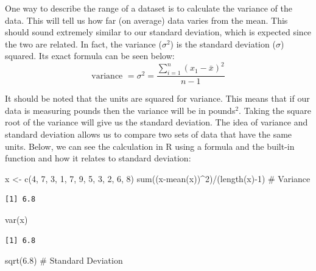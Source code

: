 \documentclass[
  letterpaper,
  DIV=11,
  numbers=noendperiod]{scrreprt}
\newenvironment{Shaded}{\begin{snugshade}}{\end{snugshade}}
\newcommand{\CommentTok}[1]{\textcolor[rgb]{0.37,0.37,0.37}{#1}}
\newcommand{\DecValTok}[1]{\textcolor[rgb]{0.68,0.00,0.00}{#1}}
\newcommand{\FloatTok}[1]{\textcolor[rgb]{0.68,0.00,0.00}{#1}}
\newcommand{\FunctionTok}[1]{\textcolor[rgb]{0.28,0.35,0.67}{#1}}
\newcommand{\NormalTok}[1]{\textcolor[rgb]{0.00,0.23,0.31}{#1}}
\newcommand{\OtherTok}[1]{\textcolor[rgb]{0.00,0.23,0.31}{#1}}
\newcommand{\SpecialCharTok}[1]{\textcolor[rgb]{0.37,0.37,0.37}{#1}}
\begin{document}
One way to describe the range of a dataset is to calculate the variance
of the data. This will tell us how far (on average) data varies from the
mean. This should sound extremely similar to our standard deviation,
which is expected since the two are related. In fact, the variance
(\(\sigma^2\)) is the standard deviation (\(\sigma\)) squared. Its exact
formula can be seen below:
\[ \text{variance } = \sigma^2 = \frac{\sum_{i=1}^n (x_1-\bar{x})^2}{n-1}\]

It should be noted that the units are squared for variance. This means
that if our data is measuring pounds then the variance will be in
pounds\(^2\). Taking the square root of the variance will give us the
standard deviation. The idea of variance and standard deviation allows
us to compare two sets of data that have the same units. Below, we can
see the calculation in R using a formula and the built-in function and
how it relates to standard deviation:

\begin{Shaded}
\begin{Highlighting}[]
\NormalTok{x }\OtherTok{\textless{}{-}} \FunctionTok{c}\NormalTok{(}\DecValTok{4}\NormalTok{, }\DecValTok{7}\NormalTok{, }\DecValTok{3}\NormalTok{, }\DecValTok{1}\NormalTok{, }\DecValTok{7}\NormalTok{, }\DecValTok{9}\NormalTok{, }\DecValTok{5}\NormalTok{, }\DecValTok{3}\NormalTok{, }\DecValTok{2}\NormalTok{, }\DecValTok{6}\NormalTok{, }\DecValTok{8}\NormalTok{)}
\FunctionTok{sum}\NormalTok{((x}\SpecialCharTok{{-}}\FunctionTok{mean}\NormalTok{(x))}\SpecialCharTok{\^{}}\DecValTok{2}\NormalTok{)}\SpecialCharTok{/}\NormalTok{(}\FunctionTok{length}\NormalTok{(x)}\SpecialCharTok{{-}}\DecValTok{1}\NormalTok{) }\CommentTok{\# Variance}
\end{Highlighting}
\end{Shaded}

\begin{verbatim}
[1] 6.8
\end{verbatim}

\begin{Shaded}
\begin{Highlighting}[]
\FunctionTok{var}\NormalTok{(x)}
\end{Highlighting}
\end{Shaded}

\begin{verbatim}
[1] 6.8
\end{verbatim}

\begin{Shaded}
\begin{Highlighting}[]
\FunctionTok{sqrt}\NormalTok{(}\FloatTok{6.8}\NormalTok{) }\CommentTok{\# Standard Deviation}
\end{Highlighting}
\end{Shaded}
\end{document}
